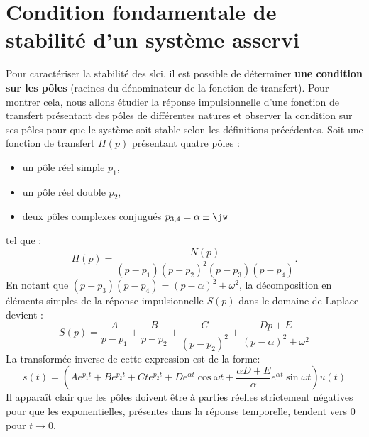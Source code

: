 \section[Condition fondamentale de stabilité]
{Condition fondamentale de stabilité d'un système asservi}
Pour caractériser la stabilité des \gls{slci}, il est possible de déterminer
\textbf{une condition sur les pôles} (racines du dénominateur de la fonction de 
transfert). Pour montrer cela, nous allons étudier la réponse impulsionnelle 
d'une fonction de transfert présentant des pôles de différentes natures et 
observer la condition sur ses pôles pour que le système soit stable selon les 
définitions précédentes. 
Soit une fonction de transfert $H(p)$ présentant quatre pôles :
\begin{itemize}
    \item un pôle réel simple $p_1$,
    \item un pôle réel double $p_2$,
    \item deux pôles complexes conjugués $p_{3,4}=\alpha\pm\jw$
\end{itemize}
tel que :
\[
    H(p)=\dfrac{N(p)}{(p-p_1)(p-p_2)^2(p-p_3)(p-p_4)}.
\]
En notant que $(p-p_3)(p-p_4)=(p-\alpha)^2+\omega^2$, 
la décomposition en éléments simples de la réponse impulsionnelle $S(p)$ 
dans le domaine de Laplace devient :
\[
    S(p)=\dfrac{A}{p-p_1}
        +\dfrac{B}{p-p_2}
        +\dfrac{C}{(p-p_2)^2}
        +\dfrac{Dp+E}{(p-\alpha)^2+\omega^2}
\]
La transformée inverse de cette expression est de la forme:
\[
    s(t)=\left(Ae^{p_1t}
              +Be^{p_2t}
              +Cte^{p_2t}
              +De^{\alpha t}\cos{\omega t}
              +\dfrac{\alpha D+E}{\alpha}e^{\alpha t}\sin{\omega t}\right)u(t)
\]
Il apparaît clair que les pôles doivent être à parties réelles strictement 
négatives pour que les exponentielles, présentes dans la réponse temporelle, 
tendent vers 0 pour $t\to0$.
\clearpage
\thispagestyle{empty}
